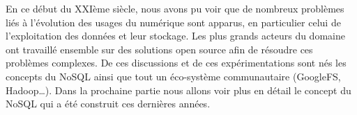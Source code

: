 En ce début du XXIème siècle, nous avons pu voir que de nombreux problèmes liés à l'évolution des usages du numérique sont apparus, en particulier celui de l'exploitation des données et leur stockage. Les plus grands acteurs du domaine ont travaillé ensemble sur des solutions open source afin de résoudre ces problèmes complexes. De ces discussions et de ces expérimentations sont nés les concepts du NoSQL ainsi que tout un éco-système communautaire (GoogleFS, Hadoop\dots). Dans la prochaine partie nous allons voir plus en détail le concept du NoSQL qui a été construit ces dernières années.
